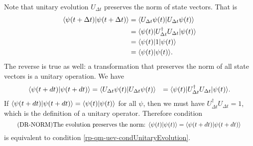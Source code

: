 Note that unitary evolution $U_{\Delta t}$ preserves the norm of state vectors. That is
\begin{equation}
	\begin{aligned}
        \langle\psi(t + \Delta t) | \psi(t + \Delta t)\rangle &= \langle U_{\Delta t} \psi(t) | U_{\Delta t} \psi(t)\rangle \\
        &=\langle  \psi(t) | U^{\dagger}_{\Delta t} U_{\Delta t} | \psi(t)\rangle \\
        &=\langle  \psi(t) | 1 | \psi(t)\rangle \\
        &=\langle  \psi(t) | \psi(t)\rangle.
	\end{aligned}
\end{equation}
The reverse is true as well: a transformation that preserves the norm of all state vectors is a unitary operation. We have
\begin{equation}
	\begin{aligned}
		\langle \psi(t+dt) | \psi(t+dt) \rangle &= \langle U_{\Delta t} \psi(t) | U_{\Delta t} \psi(t)\rangle
		&= \langle \psi(t) | U^{\dagger}_{\Delta t} U_{\Delta t} | \psi(t)\rangle.
	\end{aligned}
\end{equation}
If $\langle \psi(t+dt) | \psi(t+dt) \rangle = \langle  \psi(t) | \psi(t)\rangle$ for all $\psi$, then we must have $U^{\dagger}_{\Delta t} U_{\Delta t} = 1$, which is the definition of a unitary operator. Therefore condition
\begin{equation}\label{rp-qm-uev-condNormalized}
	\tag{DR-NORM}
	\eqtext{The evolution preserves the norm: $\< \psi(t) | \psi(t) \> = \< \psi(t+dt) | \psi(t+dt) \>$} 
\end{equation}
is equivalent to condition \ref{rp-qm-uev-condUnitaryEvolution}.

